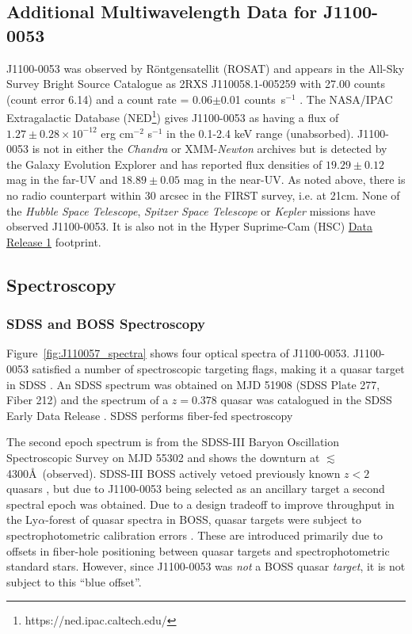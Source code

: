 \documentclass[a4paper,fleqn,usenatbib]{mnras}
\begin{document}
\subsection{Additional Multiwavelength Data for J1100-0053}
J1100-0053 was observed by R\"{o}ntgensatellit (ROSAT) and appears in
the All-Sky Survey Bright Source Catalogue \citep[RASS-BSC;
][]{Appenzeller1998, Voges1999} as 2RXS J110058.1-005259 with 27.00
counts (count error 6.14) and a count rate = 0.06$\pm$0.01
counts~s$^{-1}$ \citep{Boller2016}. The NASA/IPAC Extragalactic
Database (NED\footnote{https://ned.ipac.caltech.edu/}) gives
J1100-0053 as having a flux of $1.27\pm0.28 \times10^{-12}$ erg cm$^{-2}$
s$^{-1}$ in the 0.1-2.4 keV range (unabsorbed). J1100-0053 is not in
either the {\it Chandra} or XMM-{\it Newton} archives but is detected
by the Galaxy Evolution Explorer \citep[GALEX; ][]{Martin2005,
Morrissey2007} and has reported flux densities of $19.29\pm0.12$ mag in
the far-UV and $18.89\pm0.05$ mag in the near-UV. As noted above,
there is no radio counterpart within 30 arcsec in the FIRST survey,
i.e. at 21cm. None of the {\it Hubble Space Telescope}, {\it Spitzer
Space Telescope} or {\it Kepler} missions have observed J1100-0053.
It is also not in the Hyper Suprime-Cam (HSC)
\href{https://hsc-release.mtk.nao.ac.jp/doc/}{Data Release 1}
\citep{Aihara2017} footprint.


\subsection{Spectroscopy}
\subsubsection{SDSS and BOSS Spectroscopy}

Figure~\ref{fig:J110057_spectra} shows four optical spectra of
J1100-0053. J1100-0053 satisfied a number of spectroscopic targeting
flags, making it a quasar target in SDSS \citep{Richards2002}. An SDSS
spectrum was obtained on MJD 51908 (SDSS Plate 277, Fiber 212) and the
spectrum of a $z=0.378$ quasar was catalogued in the SDSS Early Data
Release \citep{Stoughton2002, Schneider2002}. 
SDSS performs fiber-fed spectroscopy 

The second epoch spectrum is from the SDSS-III Baryon Oscillation
Spectroscopic Survey \citep[BOSS; ][]{Dawson2013} on MJD 55302 and
shows the downturn at $\lesssim$4300\AA\ (observed). SDSS-III BOSS
actively vetoed previously known $z<2$ quasars \citep{Ross2012}, but
due to J1100-0053 being selected as an ancillary target \citep[via a
white dwarf program;][]{Kepler2015, Kepler2016} a second spectral
epoch was obtained. Due to a design tradeoff to improve throughput in
the Ly$\alpha$-forest of quasar spectra in BOSS, quasar targets were
subject to spectrophotometric calibration errors
\citep{Margala2016}. These are introduced primarily due to offsets in
fiber-hole positioning between quasar targets and spectrophotometric
standard stars. However, since J1100-0053 was {\it not} a BOSS quasar
{\it target}, it is not subject to this ``blue offset''. 
\end{document}
